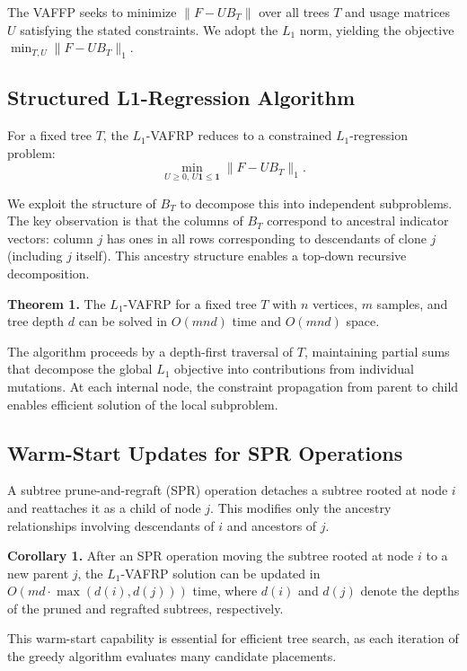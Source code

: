\documentclass[11pt]{article}
\begin{document}
The VAFFP seeks to minimize $\|F - UB_T\|$ over all trees $T$ and usage matrices $U$ satisfying the stated constraints. We adopt the $L_1$ norm, yielding the objective $\min_{T, U} \|F - UB_T\|_1$.

\subsection{Structured L1-Regression Algorithm}

For a fixed tree $T$, the $L_1$-VAFRP reduces to a constrained $L_1$-regression problem:
\begin{equation}
\min_{U \geq 0,\, U\mathbf{1} \leq \mathbf{1}} \|F - UB_T\|_1.
\end{equation}

We exploit the structure of $B_T$ to decompose this into independent subproblems. The key observation is that the columns of $B_T$ correspond to ancestral indicator vectors: column $j$ has ones in all rows corresponding to descendants of clone $j$ (including $j$ itself). This ancestry structure enables a top-down recursive decomposition.

\textbf{Theorem 1.} The $L_1$-VAFRP for a fixed tree $T$ with $n$ vertices, $m$ samples, and tree depth $d$ can be solved in $O(mnd)$ time and $O(mnd)$ space.

The algorithm proceeds by a depth-first traversal of $T$, maintaining partial sums that decompose the global $L_1$ objective into contributions from individual mutations. At each internal node, the constraint propagation from parent to child enables efficient solution of the local subproblem.

\subsection{Warm-Start Updates for SPR Operations}

A subtree prune-and-regraft (SPR) operation detaches a subtree rooted at node $i$ and reattaches it as a child of node $j$. This modifies only the ancestry relationships involving descendants of $i$ and ancestors of $j$.

\textbf{Corollary 1.} After an SPR operation moving the subtree rooted at node $i$ to a new parent $j$, the $L_1$-VAFRP solution can be updated in $O(md \cdot \max(d(i), d(j)))$ time, where $d(i)$ and $d(j)$ denote the depths of the pruned and regrafted subtrees, respectively.

This warm-start capability is essential for efficient tree search, as each iteration of the greedy algorithm evaluates many candidate placements.
\end{document}
